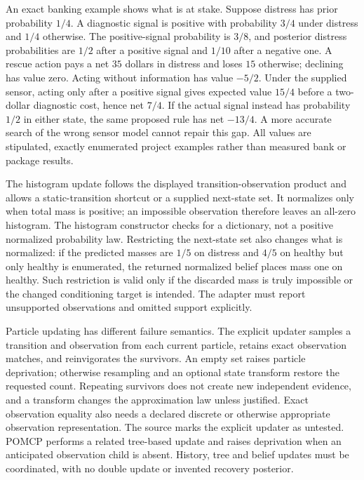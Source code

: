 An exact banking example shows what is at stake. Suppose distress has prior
probability $1/4$. A diagnostic signal is positive with probability $3/4$ under
distress and $1/4$ otherwise. The positive-signal probability is $3/8$, and
posterior distress probabilities are $1/2$ after a positive signal and $1/10$
after a negative one. A rescue action pays a net $35$ dollars in distress and
loses $15$ otherwise; declining has value zero. Acting without information has
value $-5/2$. Under the supplied sensor, acting only after a positive signal
gives expected value $15/4$ before a two-dollar diagnostic cost, hence net
$7/4$. If the actual signal instead has probability $1/2$ in either state,
the same proposed rule has net $-13/4$. A more accurate search of the wrong
sensor model cannot repair this gap. All values are stipulated, exactly
enumerated project examples rather than measured bank or package results.
\citep{exec23_pomdppy_reference}

The histogram update follows the displayed transition-observation product and
allows a static-transition shortcut or a supplied next-state set. It normalizes
only when total mass is positive; an impossible observation therefore leaves
an all-zero histogram. The histogram constructor checks for a dictionary, not
a positive normalized probability law. Restricting the next-state set also
changes what is normalized: if the predicted masses are $1/5$ on distress and
$4/5$ on healthy but only healthy is enumerated, the returned normalized belief
places mass one on healthy. Such restriction is valid only if the discarded
mass is truly impossible or the changed conditioning target is intended.
The adapter must report unsupported observations and omitted support explicitly.
\citep{exec23_pomdppy_sources,exec23_pomdppy_reference}

Particle updating has different failure semantics. The explicit updater samples
a transition and observation from each current particle, retains exact
observation matches, and reinvigorates the survivors. An empty set raises
particle deprivation; otherwise resampling and an optional state transform
restore the requested count. Repeating survivors does not create new
independent evidence, and a transform changes the approximation law unless
justified. Exact observation equality also needs a declared discrete or
otherwise appropriate observation representation. The source marks the explicit
updater as untested. POMCP performs a related tree-based update and raises
deprivation when an anticipated observation child is absent. History, tree and
belief updates must be coordinated, with no double update or invented recovery
posterior. \citep{exec23_pomdppy_sources}

